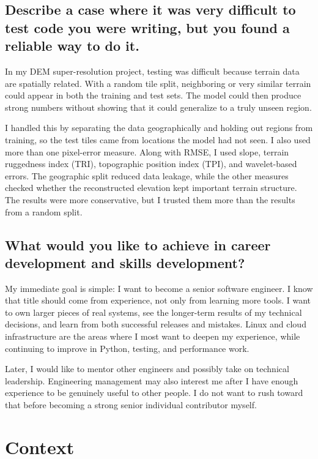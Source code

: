 \documentclass[11pt]{article}
\begin{document}
\subsection*{Describe a case where it was very difficult to test code you were writing, but you found a reliable way to do it.}

In my DEM super-resolution project, testing was difficult because terrain data are spatially related. With a random tile split, neighboring or very similar terrain could appear in both the training and test sets. The model could then produce strong numbers without showing that it could generalize to a truly unseen region.

I handled this by separating the data geographically and holding out regions from training, so the test tiles came from locations the model had not seen. I also used more than one pixel-error measure. Along with RMSE, I used slope, terrain ruggedness index (TRI), topographic position index (TPI), and wavelet-based errors. The geographic split reduced data leakage, while the other measures checked whether the reconstructed elevation kept important terrain structure. The results were more conservative, but I trusted them more than the results from a random split.

\subsection*{What would you like to achieve in career development and skills development?}

My immediate goal is simple: I want to become a senior software engineer. I know that title should come from experience, not only from learning more tools. I want to own larger pieces of real systems, see the longer-term results of my technical decisions, and learn from both successful releases and mistakes. Linux and cloud infrastructure are the areas where I most want to deepen my experience, while continuing to improve in Python, testing, and performance work.

Later, I would like to mentor other engineers and possibly take on technical leadership. Engineering management may also interest me after I have enough experience to be genuinely useful to other people. I do not want to rush toward that before becoming a strong senior individual contributor myself.

\section*{Context}
\end{document}
